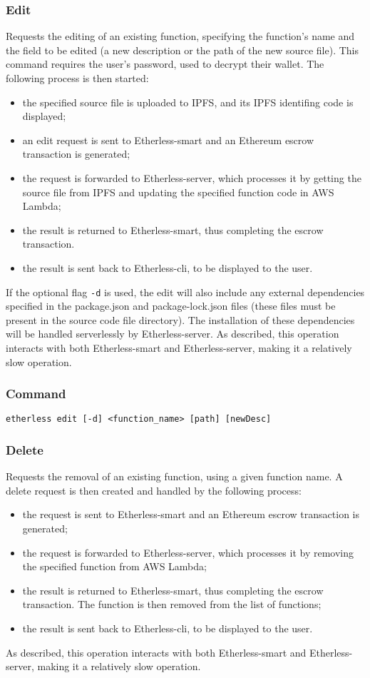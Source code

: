 	\subsubsection{Edit}
	Requests the editing of an existing function, specifying the function's name and the field to be edited (a new description or the path of the new source file). This command requires the user's password, used to decrypt their wallet. The following process is then started:
	\begin{itemize}
		\item the specified source file is uploaded to IPFS, and its IPFS identifing code is displayed;
		\item an edit request is sent to Etherless-smart and an Ethereum escrow transaction is generated;
		\item the request is forwarded to Etherless-server, which processes it by getting the source file from IPFS and updating the specified function code in AWS Lambda;
		\item the result is returned to Etherless-smart, thus completing the escrow transaction.
		\item the result is sent back to Etherless-cli, to be displayed to the user.
	\end{itemize}
	If the optional flag \texttt{-d} is used, the edit will also include any external dependencies specified in the package.json and package-lock.json files (these files must be present in the source code file directory). The installation of these dependencies will be handled serverlessly by Etherless-server.
	As described, this operation interacts with both Etherless-smart and Etherless-server, making it a relatively slow operation.
	\subsubsection*{Command}
	\texttt{etherless edit [-d] <function\_name> [path] [newDesc]}
	\subsubsection{Delete}
	Requests the removal of an existing function, using a given function name. A delete request is then created and handled by the following process:
	\begin{itemize}
		\item the request is sent to Etherless-smart and an Ethereum escrow transaction is generated;
		\item the request is forwarded to Etherless-server, which processes it by removing the specified function from AWS Lambda;
		\item the result is returned to Etherless-smart, thus completing the escrow transaction. The function is then removed from the list of functions;
		\item the result is sent back to Etherless-cli, to be displayed to the user.
	\end{itemize}
	As described, this operation interacts with both Etherless-smart and Etherless-server, making it a relatively slow operation.
